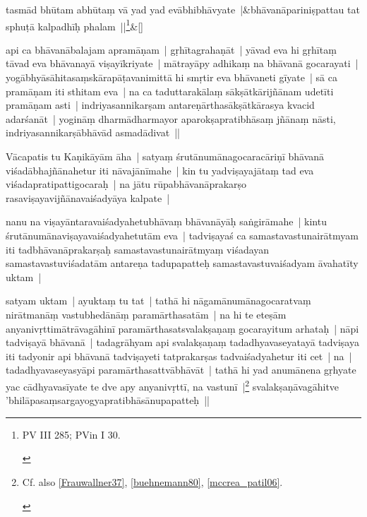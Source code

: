 \documentclass[article,a4paper]{memoir}
\begin{document}
	    
	    \stanza[\smallbreak]
tasmā\-d bhū\-tam abhū\-taṃ vā\- yad yad evā\-bhibhā\-vyate |&bhā\-vanā\-pariniṣpattau tat sphuṭā\- kalpadhī\-ḥ phalam ||\footnote{\begin{english}PV III 285; PVin I 30.\end{english}}\&[\smallbreak]


	

	  \pstart api ca bhā\-vanā\-balajam apramā\-ṇam | gṛhī\-tagrahaṇā\-t | yā\-vad eva hi gṛhī\-taṃ tā\-vad eva bhā\-vanayā\- viṣayī\-kriyate | mā\-trayā\-py adhikaṃ na bhā\-vanā\- gocarayati | yogā\-bhyā\-sā\-hitasaṃskā\-rapā\-ṭavanimittā\- hi smṛtir eva bhā\-vaneti gī\-yate | sā\- ca pramā\-ṇam iti sthitam eva | na ca taduttarakā\-laṃ sā\-kṣā\-tkā\-rijñā\-nam udetī\-ti pramā\-ṇam asti | indriyasannikarṣam antareṇā\-rthasā\-kṣā\-tkā\-rasya kvacid adarśanā\-t | yoginā\-ṃ dharmā\-dharmayor aparokṣapratibhā\-saṃ jñā\-naṃ nā\-sti, indriyasannikarṣā\-bhā\-vā\-d asmadā\-divat || 
	\pend
      

	  \pstart Vā\-capatis tu Kaṇikā\-yā\-m ā\-ha | satyaṃ śrutā\-numā\-nagocaracā\-riṇī\- bhā\-vanā\- viśadā\-bhajñā\-nahetur iti nā\-vajā\-nī\-mahe | kin tu yadviṣayajā\-taṃ tad eva viśadapratipattigocaraḥ | na jā\-tu rū\-pabhā\-vanā\-prakarṣo rasaviṣayavijñā\-navaiśadyā\-ya kalpate | 
	\pend
      

	  \pstart nanu na viṣayā\-ntaravaiśadyahetubhā\-vaṃ bhā\-vanā\-yā\-ḥ saṅgirā\-mahe | kintu śrutā\-numā\-naviṣayavaiśadyahetutā\-m eva | tadviṣayaś ca samastavastunairā\-tmyam iti tadbhā\-vanā\-prakarṣaḥ samastavastunairā\-tmyaṃ viśadayan samastavastuviśadatā\-m antareṇa tadupapatteḥ samastavastuvaiśadyam ā\-vahatī\-ty uktam | 
	\pend
      

	  \pstart satyam uktam | ayuktaṃ tu tat | tathā\- hi nā\-gamā\-numā\-nagocaratvaṃ nirā\-tmanā\-ṃ vastubhedā\-nā\-ṃ paramā\-rthasatā\-m | na hi te eteṣā\-m anyanivṛttimā\-trā\-vagā\-hinī\- paramā\-rthasatsvalakṣaṇaṃ gocarayitum arhataḥ | nā\-pi tadviṣayā\- bhā\-vanā\- | tadagrā\-hyam api svalakṣaṇaṃ tadadhyavaseyatayā\- tadviṣaya iti tadyonir api bhā\-vanā\- tadviṣayeti tatprakarṣas tadvaiśadyahetur iti cet | na | tadadhyavaseyasyā\-pi paramā\-rthasattvā\-bhā\-vā\-t | tathā\- hi yad anumā\-nena gṛhyate yac cā\-dhyavasī\-yate te dve apy anyanivṛttī\-, na vastunī\- |\footnote{\label{note-2objects-neither-real}  \begin{english}Cf. also \cref{Frauwallner37}, \cref{buehnemann80}, \cref{mccrea_patil06}.\end{english}} svalakṣaṇā\-vagā\-hitve 'bhilā\-pasaṃsargayogyapratibhā\-sā\-nupapatteḥ ||
	\pend
      
\end{document}
